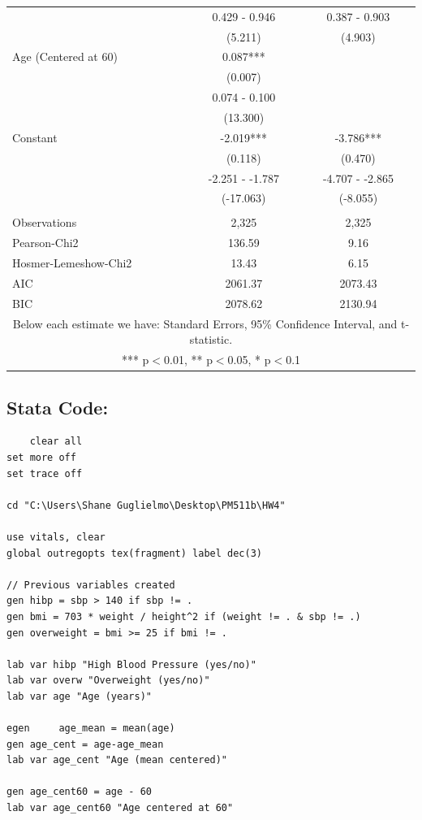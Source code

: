 \documentclass{article}
\begin{document}
\begin{enumerate}[a.]
\begin{table}[!h]
\begin{center}
\begin{tabular}{lcc}
 & 0.429 - 0.946 & 0.387 - 0.903 \\
 & (5.211) & (4.903) \\
Age (Centered at 60) & 0.087*** &  \\
 & (0.007) &  \\
 & 0.074 - 0.100 &  \\
 & (13.300) &  \\
Constant & -2.019*** & -3.786*** \\
 & (0.118) & (0.470) \\
 & -2.251 - -1.787 & -4.707 - -2.865 \\
 & (-17.063) & (-8.055) \\
 &  &  \\
Observations & 2,325 & 2,325 \\
Pearson-Chi2 & 136.59 & 9.16 \\
Hosmer-Lemeshow-Chi2 & 13.43 & 6.15 \\
AIC & 2061.37 & 2073.43 \\
 BIC & 2078.62 & 2130.94 \\ \hline
\multicolumn{3}{c}{Below each estimate we have: Standard Errors, 95\% Confidence Interval, and t-statistic.} \\
\multicolumn{3}{c}{ *** p$<$0.01, ** p$<$0.05, * p$<$0.1} \\
\end{tabular}
\end{center}
\end{table}
\clearpage

\subsection*{Stata Code:}
\begin{verbatim}
    clear all
set more off
set trace off

cd "C:\Users\Shane Guglielmo\Desktop\PM511b\HW4"

use vitals, clear
global outregopts tex(fragment) label dec(3)

// Previous variables created
gen hibp = sbp > 140 if sbp != .
gen bmi = 703 * weight / height^2 if (weight != . & sbp != .)
gen overweight = bmi >= 25 if bmi != .

lab var hibp "High Blood Pressure (yes/no)"
lab var overw "Overweight (yes/no)"
lab var age "Age (years)"

egen     age_mean = mean(age)
gen age_cent = age-age_mean
lab var age_cent "Age (mean centered)"

gen age_cent60 = age - 60
lab var age_cent60 "Age centered at 60"



\end{verbatim}
\end{enumerate}
\end{document}
